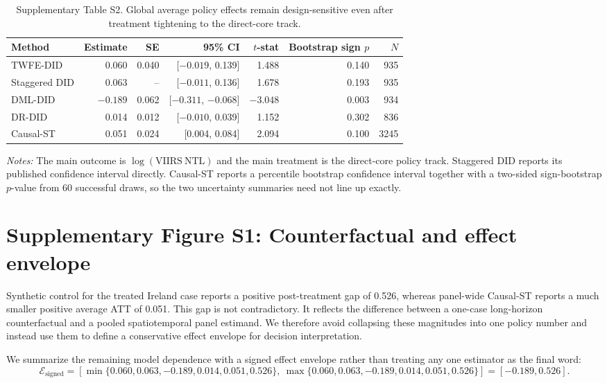 \documentclass[oneside,pdflatex,sn-nature]{sn-jnl}
\begin{document}
\begin{table}[H]
\centering
\caption{Supplementary Table S2. Global average policy effects remain design-sensitive even after treatment tightening to the direct-core track.}
\small
\setlength{\tabcolsep}{5pt}
\begin{tabular}{lrrrrrr}
\toprule
Method & Estimate & SE & 95\% CI & $t$-stat & Bootstrap sign $p$ & $N$ \\
\midrule
TWFE-DID & 0.060 & 0.040 & [$-0.019$, 0.139] & 1.488 & 0.140 & 935 \\
Staggered DID & 0.063 & -- & [$-0.011$, 0.136] & 1.678 & 0.193 & 935 \\
DML-DID & $-0.189$ & 0.062 & [$-0.311$, $-0.068$] & $-3.048$ & 0.003 & 934 \\
DR-DID & 0.014 & 0.012 & [$-0.010$, 0.039] & 1.152 & 0.302 & 836 \\
Causal-ST & 0.051 & 0.024 & [0.004, 0.084] & 2.094 & 0.100 & 3245 \\
\bottomrule
\end{tabular}
\end{table}
\FloatBarrier

\noindent\textit{Notes:} The main outcome is $\log(\mathrm{VIIRS\ NTL})$ and the main treatment is the direct-core policy track. Staggered DID reports its published confidence interval directly. Causal-ST reports a percentile bootstrap confidence interval together with a two-sided sign-bootstrap $p$-value from 60 successful draws, so the two uncertainty summaries need not line up exactly.

\section{Supplementary Figure S1: Counterfactual and effect envelope}

Synthetic control for the treated Ireland case reports a positive post-treatment gap of 0.526, whereas panel-wide Causal-ST reports a much smaller positive average ATT of 0.051.
This gap is not contradictory.
It reflects the difference between a one-case long-horizon counterfactual and a pooled spatiotemporal panel estimand.
We therefore avoid collapsing these magnitudes into one policy number and instead use them to define a conservative effect envelope for decision interpretation.

We summarize the remaining model dependence with a signed effect envelope rather than treating any one estimator as the final word:
\[
\mathcal{E}_{\text{signed}} = \left[\min\{0.060, 0.063, -0.189, 0.014, 0.051, 0.526\},\ \max\{0.060, 0.063, -0.189, 0.014, 0.051, 0.526\}\right] = [-0.189, 0.526].
\]
\end{document}
